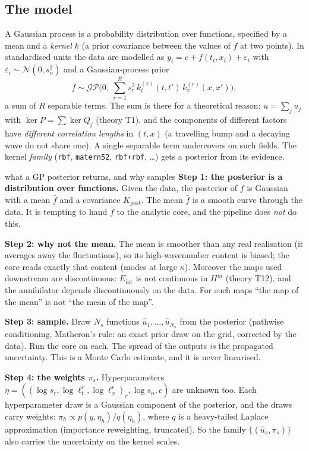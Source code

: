 \documentclass[11pt,a4paper]{article}
\theoremstyle{definition}
\newcommand{\Eint}{E_{\mathrm{int}}}
\newcommand{\thy}[1]{\textcolor{cG}{\textsf{\footnotesize(theory #1)}}}
\begin{document}
\subsection{The model}
A Gaussian process is a probability distribution over functions, specified by a mean and a \emph{kernel} $k$ (a prior covariance between the values of $f$ at two points). In standardised units the data are modelled as $y_i=c+f(t_i,x_i)+\varepsilon_i$ with $\varepsilon_i\sim\mathcal N(0,s_n^2)$ and a Gaussian-process prior
\begin{equation}\label{eq:gp}
f\sim\mathcal{GP}\Big(0,\ \sum_{r=1}^{R}s_r^2\,k_t^{(r)}(t,t')\,k_x^{(r)}(x,x')\Big),
\end{equation}
a sum of $R$ separable terms. The sum is there for a theoretical reason: $u=\sum_ju_j$ with $\ker P=\sum\ker Q_j$ \thy{T1}, and the components of different factors have \emph{different correlation lengths} in $(t,x)$ (a travelling bump and a decaying wave do not share one). A single separable term undercovers on such fields. The kernel \emph{family} (\texttt{rbf}, \texttt{matern52}, \texttt{rbf+rbf}, \dots) gets a posterior from its evidence.

\begin{explained}{what a GP posterior returns, and why samples}
\textbf{Step 1: the posterior is a distribution over functions.} Given the data, the posterior of $f$ is Gaussian with a mean $\bar f$ and a covariance $K_{\mathrm{post}}$. The mean $\bar f$ is a smooth curve through the data. It is tempting to hand $\bar f$ to the analytic core, and the pipeline does \emph{not} do this.

\medskip\textbf{Step 2: why not the mean.} The mean is smoother than any real realisation (it averages away the fluctuations), so its high-wavenumber content is biased; the core reads exactly that content (modes at large $\kappa$). Moreover the maps used downstream are discontinuous: $\Eint$ is not continuous in $H^m$ \thy{T12}, and the annihilator depends discontinuously on the data. For such maps ``the map of the mean'' is not ``the mean of the map''.

\medskip\textbf{Step 3: sample.} Draw $N_s$ functions $\hat u_1,\dots,\hat u_{N_s}$ from the posterior (pathwise conditioning, Matheron's rule: an exact prior draw on the grid, corrected by the data). Run the core on each. The spread of the outputs \emph{is} the propagated uncertainty. This is a Monte Carlo estimate, and it is never linearised.

\medskip\textbf{Step 4: the weights $\pi_s$.} Hyperparameters $\eta=((\log s_r,\log\ell_t^r,\log\ell_x^r)_r,\log s_n,c)$ are unknown too. Each hyperparameter draw is a Gaussian component of the posterior, and the draws carry weights: $\pi_h\propto p(y,\eta_h)/q(\eta_h)$, where $q$ is a heavy-tailed Laplace approximation (importance reweighting, truncated). So the family $\{(\hat u_s,\pi_s)\}$ also carries the uncertainty on the kernel scales.
\end{explained}
\end{document}
